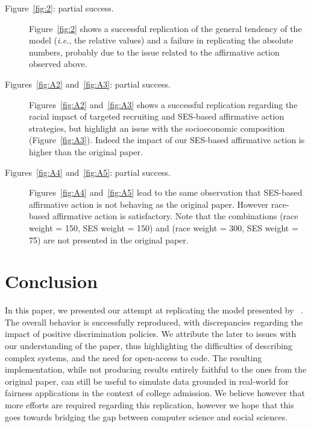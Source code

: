 \begin{description}
\item[Figure~\ref{fig:2}: partial success.]  Figure~\ref{fig:2} shows a successful replication of the general tendency of the model (\emph{i.e.}, the relative values) and a failure in replicating the absolute numbers, probably due to the issue related to the affirmative action observed above.

\item[Figures~\ref{fig:A2} and~\ref{fig:A3}: partial success.] Figures~\ref{fig:A2} and~\ref{fig:A3} shows a successful replication regarding the racial impact of targeted recruiting and SES-based affirmative action strategies, but highlight an issue with the socioeconomic composition (Figure~\ref{fig:A3}). Indeed the impact of our SES-based affirmative action is higher than the original paper.

\item[Figures~\ref{fig:A4} and~\ref{fig:A5}: partial success.] Figures~\ref{fig:A4} and~\ref{fig:A5} lead to the same observation that SES-based affirmative action is not behaving as the original paper. However race-based affirmative action is satisfactory. Note that the combinations (race weight = 150, SES weight = 150) and (race weight = 300, SES weight = 75) are not presented in the original paper.

\end{description}

\section{Conclusion}

In this paper, we presented our attempt at replicating the model presented by \citeauthor{reardon2018levels}~\cite{reardon2018levels}.
The overall behavior is successfully reproduced, with discrepancies regarding the impact of positive discrimination policies.
We attribute the later to issues with our understanding of the paper, thus highlighting the difficulties of describing complex systems, and the need for open-access to code.
The resulting implementation, while not producing results entirely faithful to the ones from the original paper, can still be useful to simulate data grounded in real-world for fairness applications in the context of college admission.
We believe however that more efforts are required regarding this replication, however we hope that this goes towards bridging the gap between computer science and social sciences.

\clearpage

